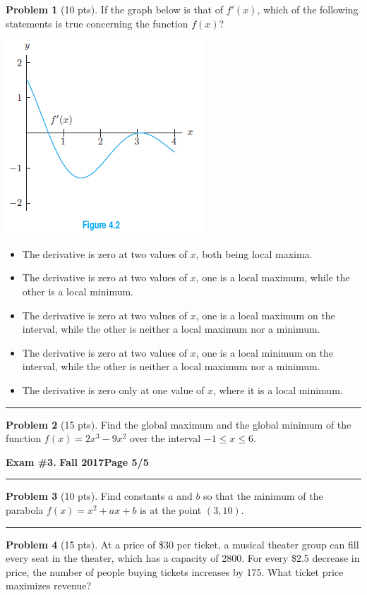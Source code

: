 \documentclass[12pt]{article}
\makeatletter
\theoremstyle{definition}
\newtheorem{problem}{Problem}
\newcommand*{\radiobutton}{%
  \@ifstar{\@radiobutton0}{\@radiobutton1}%
}
\newcommand*{\@radiobutton}[1]{%
  \begin{tikzpicture}
    \pgfmathsetlengthmacro\radius{height("X")/2}
    \draw[radius=\radius] circle;
    \ifcase#1 \fill[radius=.6*\radius] circle;\fi
  \end{tikzpicture}%
}
\makeatother
\begin{document}
\begin{problem}[10 pts]
If the graph below is that of $f'(x)$, which of the following statements is true concerning the function $f(x)$?
\begin{center}
\includegraphics{3graph2}
\end{center}
\begin{itemize}
\item[\radiobutton] The derivative is zero at two values of $x$, both being local maxima.
\item[\radiobutton] The derivative is zero at two values of $x$, one is a local maximum, while the other is a local minimum.
\item[\radiobutton] The derivative is zero at two values of $x$, one is a local maximum on the interval, while the other is neither a local maximum nor a minimum.
\item[\radiobutton] The derivative is zero at two values of $x$, one is a local minimum on the interval, while the other is neither a local maximum nor a minimum.
\item[\radiobutton] The derivative is zero only at one value of $x$, where it is a local minimum.
\end{itemize}
\end{problem}

\hrule
\begin{problem}[15 pts]
Find the global maximum and the global minimum of the function $f(x) = 2x^3 - 9x^2$ over the interval $-1 \leq x \leq 6$.
\end{problem}
\newpage

\hfill{\large\bf Exam \#3.}\hfill{\large\bf
  Fall 2017}\hfill{\large\bf Page 5/5}\hrule

\bigskip


\begin{problem}[10 pts]
Find constants $a$ and $b$ so that the minimum of the parabola $f(x) = x^2 + ax + b$ is at the point $(3,10)$.

\vspace{9cm}
\end{problem}
\hrule

\begin{problem}[15 pts]
At a price of \$30 per ticket, a musical theater group can fill every seat in the theater, which has a capacity of 2800.  For every \$2.5 decrease in price, the number of people buying tickets increases by 175.  What ticket price maximizes revenue?
\end{problem}
\end{document}
